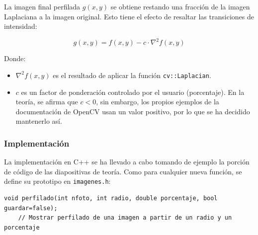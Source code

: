 \documentclass[11pt]{article}
\begin{document}
          La imagen final perfilada $g(x,y)$ se obtiene restando una fracción de la
          imagen Laplaciana a la imagen original. Esto tiene el efecto de resaltar las
          transiciones de intensidad:

          \[
              g(x,y) = f(x,y) - c \cdot \nabla^2 f(x,y)
          \]

          \noindent
          Donde:

          \begin{itemize}
              \item \( \nabla^2 f(x,y) \) es el resultado de aplicar la función \texttt{cv::Laplacian}.

              \item \( c \) es un factor de ponderación controlado por el usuario (porcentaje). En la teoría, se afirma que \( c < 0 \), sin embargo, los propios ejemplos de la documentación de OpenCV usan un valor positivo, por lo que se ha decidido mantenerlo así.
          \end{itemize}

      \subsubsection{Implementación}

          La implementación en C++ se ha llevado a cabo tomando de ejemplo la porción de
          código de las diapositivas de teoría. Como para cualquier nueva función, se
          define su prototipo en \texttt{imagenes.h}:

          \begin{lstlisting}[style=CppQtStyle, caption={Declaracion de enum \texttt{modelo\_color}.}, label={lst:imagenes-mc}]
    void perfilado(int nfoto, int radio, double porcentaje, bool guardar=false);
    // Mostrar perfilado de una imagen a partir de un radio y un porcentaje
\end{lstlisting}

          \clearpage
\end{document}

